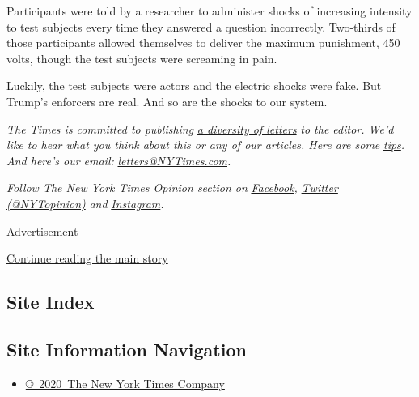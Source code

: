 Participants were told by a researcher to administer shocks of
increasing intensity to test subjects every time they answered a
question incorrectly. Two-thirds of those participants allowed
themselves to deliver the maximum punishment, 450 volts, though the test
subjects were screaming in pain.

Luckily, the test subjects were actors and the electric shocks were
fake. But Trump's enforcers are real. And so are the shocks to our
system.

\emph{The Times is committed to publishing}
\href{https://www.nytimes3xbfgragh.onion/2019/01/31/opinion/letters/letters-to-editor-new-york-times-women.html}{\emph{a
diversity of letters}} \emph{to the editor. We'd like to hear what you
think about this or any of our articles. Here are some}
\href{https://help.nytimes3xbfgragh.onion/hc/en-us/articles/115014925288-How-to-submit-a-letter-to-the-editor}{\emph{tips}}\emph{.
And here's our email:}
\href{mailto:letters@NYTimes.com}{\emph{letters@NYTimes.com}}\emph{.}

\emph{Follow The New York Times Opinion section on}
\href{https://www.facebookcorewwwi.onion/nytopinion}{\emph{Facebook}}\emph{,}
\href{http://twitter.com/NYTOpinion}{\emph{Twitter (@NYTopinion)}}
\emph{and}
\href{https://www.instagram.com/nytopinion/}{\emph{Instagram}}\emph{.}

Advertisement

\protect\hyperlink{after-bottom}{Continue reading the main story}

\hypertarget{site-index}{%
\subsection{Site Index}\label{site-index}}

\hypertarget{site-information-navigation}{%
\subsection{Site Information
Navigation}\label{site-information-navigation}}

\begin{itemize}
\tightlist
\item
  \href{https://help.nytimes3xbfgragh.onion/hc/en-us/articles/115014792127-Copyright-notice}{©~2020~The
  New York Times Company}
\end{itemize}

